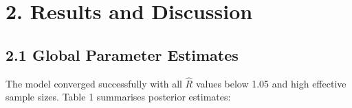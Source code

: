 \documentclass[11pt]{article}
\begin{document}
	
%	
%	
%	
	\section*{2. Results and Discussion}
	
	\subsection*{2.1 Global Parameter Estimates}
	
	The model converged successfully with all $\hat{R}$ values below 1.05 and high effective sample sizes. Table 1 summarises posterior estimates:
	
\end{document}

